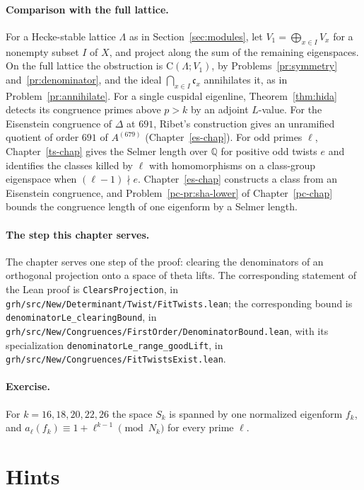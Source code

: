 \documentclass[reqno]{amsart}
\newcounter{chap}
\theoremstyle{definition}
\theoremstyle{plain}
\newcommand{\Q}{\mathbb{Q}}
\newcommand{\cc}{\mathfrak{c}}
\newcommand{\Cg}{\mathrm{C}}
\begin{document}
\paragraph{Comparison with the full lattice.}
For a Hecke-stable lattice \(\Lambda\) as in Section~\ref{sec:modules}, let \(V_1=\bigoplus_{x\in I}V_x\) for a nonempty subset \(I\) of \(X\), and project along the sum of the remaining eigenspaces.  On the full lattice the obstruction is \(\Cg(\Lambda;V_1)\), by Problems~\ref{pr:symmetry} and~\ref{pr:denominator}, and the ideal \(\bigcap_{x\in I}\cc_x\) annihilates it, as in Problem~\ref{pr:annihilate}.  For a single cuspidal eigenline, Theorem~\ref{thm:hida} detects its congruence primes above \(p>k\) by an adjoint \(L\)-value.  For the Eisenstein congruence of \(\Delta\) at \(691\), Ribet's construction gives an unramified quotient of order \(691\) of \(A^{(679)}\) (Chapter~\ref{es-chap}).  For odd primes \(\ell\), Chapter~\ref{ts-chap} gives the Selmer length over \(\Q\) for positive odd twists \(e\) and identifies the classes killed by \(\ell\) with homomorphisms on a class-group eigenspace when \((\ell-1)\nmid e\).  Chapter~\ref{es-chap} constructs a class from an Eisenstein congruence, and Problem~\ref{pc-pr:sha-lower} of Chapter~\ref{pc-chap} bounds the congruence length of one eigenform by a Selmer length.

\paragraph{The step this chapter serves.}
The chapter serves one step of the proof: clearing the denominators of an orthogonal projection onto a space of theta lifts.  The corresponding statement of the Lean proof \cite{GL} is \texttt{ClearsProjection}, in \texttt{grh/src/New/Determinant/Twist/FitTwists.lean}; the corresponding bound is \texttt{denominatorLe\_clearingBound}, in \texttt{grh/src/New/Congruences/FirstOrder/DenominatorBound.lean}, with its specialization \texttt{denominatorLe\_range\_goodLift}, in \texttt{grh/src/New/Congruences/FitTwistsExist.lean}.

\paragraph{Exercise.}
For \(k = 16, 18, 20, 22, 26\) the space \(S_k\) is spanned by one normalized eigenform \(f_k\), and \(a_\ell(f_k) \equiv 1 + \ell^{k-1} \pmod{N_k}\) for every prime \(\ell\).

\section*{Hints}
\end{document}
